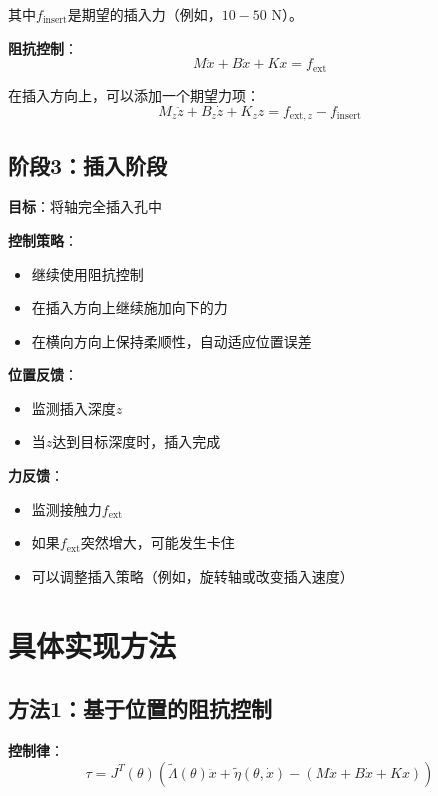 \documentclass[12pt,a4paper]{article}
\begin{document}
其中$f_{\text{insert}}$是期望的插入力（例如，$10-50$ N）。

\textbf{阻抗控制}：
\begin{equation}
M\ddot{x} + B\dot{x} + Kx = f_{\text{ext}}
\end{equation}

在插入方向上，可以添加一个期望力项：
\begin{equation}
M_z\ddot{z} + B_z\dot{z} + K_z z = f_{\text{ext},z} - f_{\text{insert}}
\end{equation}

\subsection{阶段3：插入阶段}

\textbf{目标}：将轴完全插入孔中

\textbf{控制策略}：
\begin{itemize}
\item 继续使用阻抗控制
\item 在插入方向上继续施加向下的力
\item 在横向方向上保持柔顺性，自动适应位置误差
\end{itemize}

\textbf{位置反馈}：
\begin{itemize}
\item 监测插入深度$z$
\item 当$z$达到目标深度时，插入完成
\end{itemize}

\textbf{力反馈}：
\begin{itemize}
\item 监测接触力$f_{\text{ext}}$
\item 如果$f_{\text{ext}}$突然增大，可能发生卡住
\item 可以调整插入策略（例如，旋转轴或改变插入速度）
\end{itemize}

\section{具体实现方法}

\subsection{方法1：基于位置的阻抗控制}

\textbf{控制律}：
\begin{equation}
\tau = J^T(\theta)\left(\tilde{\Lambda}(\theta)\ddot{x} + \tilde{\eta}(\theta, \dot{x}) - (M\ddot{x} + B\dot{x} + Kx)\right) \tag{11.65}
\end{equation}
\end{document}
